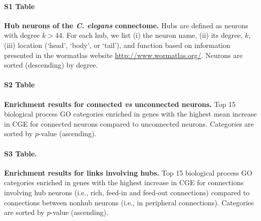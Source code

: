 \documentclass[10pt,letterpaper]{article}
\begin{document}
{%

\clearpage

\paragraph*{S1 Table}
\label{tab:HubList}
{\bf Hub neurons of the \textit{C. elegans} connectome.} Hubs are defined as neurons with degree $k > 44$.
For each hub, we list (i) the neuron name, (ii) its degree, $k$, (iii) location (`head', `body', or `tail'), and function based on information presented in the wormatlas website \url{http://www.wormatlas.org/}.
Neurons are sorted (descending) by degree.}
\paragraph*{S2 Table}
\label{tab:enrichmentCON}
{\bf Enrichment results for connected \textit{vs} unconnected neurons.} Top 15 biological process GO categories enriched in genes with the highest mean increase in CGE for connected neurons compared to unconnected neurons.
Categories are sorted by $p$-value (ascending).
\paragraph*{S3 Table.}
\label{tab:enrichmentRICH}
{\bf Enrichment results for links involving hubs.} Top 15 biological process GO categories enriched in genes with the highest increase in CGE for connections involving hub neurons (i.e., rich, feed-in and feed-out connections) compared to connections between nonhub neurons (i.e., in peripheral connections).
Categories are sorted by $p$-value (ascending).

\end{document}
